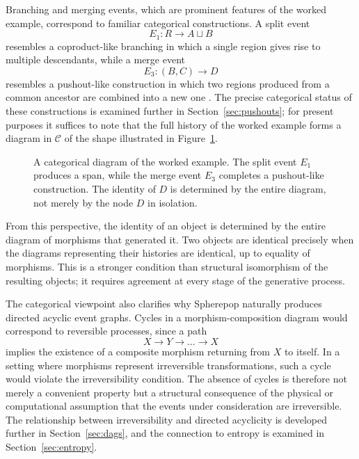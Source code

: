 \documentclass[12pt]{article}
\theoremstyle{plain}
\theoremstyle{definition}
\theoremstyle{remark}
\begin{document}
Branching and merging events, which are prominent features of the worked
example, correspond to familiar categorical constructions.  A split event
\[
  E_1 : R \rightarrow A \sqcup B
\]
resembles a coproduct-like branching in which a single region gives rise to
multiple descendants, while a merge event
\[
  E_3 : (B, C) \rightarrow D
\]
resembles a pushout-like construction in which two regions produced from a
common ancestor are combined into a new one \citep{MacLane1998, Spivak2014}.
The precise categorical status of these constructions is examined further in
Section~\ref{sec:pushouts}; for present purposes it suffices to note that
the full history of the worked example forms a diagram in $\mathcal{C}$ of
the shape illustrated in Figure~\ref{fig:categorical}.

\begin{figure}[ht]
\centering
{}
\caption{A categorical diagram of the worked example.  The split event $E_1$
produces a span, while the merge event $E_3$ completes a pushout-like
construction.  The identity of $D$ is determined by the entire diagram, not
merely by the node $D$ in isolation.}
\label{fig:categorical}
\end{figure}

From this perspective, the identity of an object is determined by the entire
diagram of morphisms that generated it.  Two objects are identical precisely
when the diagrams representing their histories are identical, up to equality of
morphisms.  This is a stronger condition than structural isomorphism of the
resulting objects; it requires agreement at every stage of the generative
process.

The categorical viewpoint also clarifies why Spherepop naturally produces
directed acyclic event graphs.  Cycles in a morphism-composition diagram would
correspond to reversible processes, since a path
\[
  X \rightarrow Y \rightarrow \dots \rightarrow X
\]
implies the existence of a composite morphism returning from $X$ to itself.  In
a setting where morphisms represent irreversible transformations, such a cycle
would violate the irreversibility condition.  The absence of cycles is therefore
not merely a convenient property but a structural consequence of the physical
or computational assumption that the events under consideration are
irreversible.  The relationship between irreversibility and directed acyclicity
is developed further in Section~\ref{sec:dags}, and the connection to entropy
is examined in Section~\ref{sec:entropy}.
\end{document}
